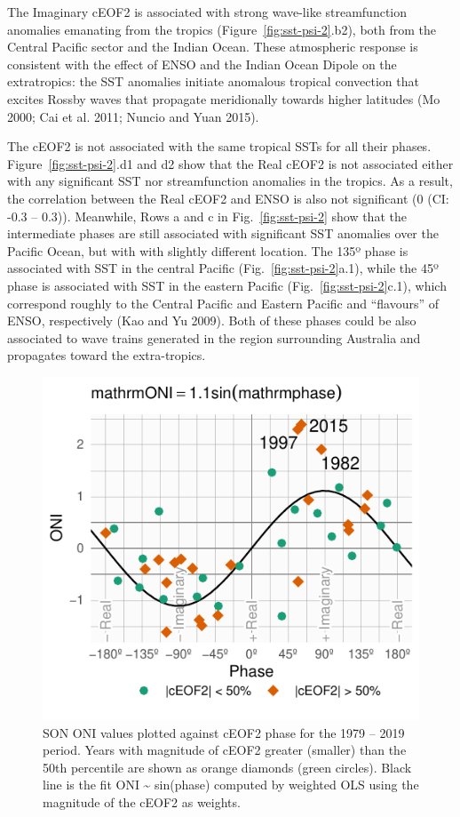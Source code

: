 \documentclass[smallextended]{svjour3}       %
\begin{document}
The Imaginary cEOF2 is associated with strong wave-like streamfunction anomalies emanating from the tropics (Figure~\ref{fig:sst-psi-2}.b2), both from the Central Pacific sector and the Indian Ocean.
These atmospheric response is consistent with the effect of ENSO and the Indian Ocean Dipole on the extratropics: the SST anomalies initiate anomalous tropical convection that excites Rossby waves that propagate meridionally towards higher latitudes (Mo 2000; Cai et al. 2011; Nuncio and Yuan 2015).

The cEOF2 is not associated with the same tropical SSTs for all their phases.
Figure~\ref{fig:sst-psi-2}.d1 and d2 show that the Real cEOF2 is not associated either with any significant SST nor streamfunction anomalies in the tropics.
As a result, the correlation between the Real cEOF2 and ENSO is also not significant (0 (CI: -0.3 -- 0.3)).
Meanwhile, Rows a and c in Fig.~\ref{fig:sst-psi-2} show that the intermediate phases are still associated with significant SST anomalies over the Pacific Ocean, but with with slightly different location.
The 135º phase is associated with SST in the central Pacific (Fig.~\ref{fig:sst-psi-2}a.1), while the 45º phase is associated with SST in the eastern Pacific (Fig.~\ref{fig:sst-psi-2}c.1), which correspond roughly to the Central Pacific and Eastern Pacific and ``flavours'' of ENSO, respectively (Kao and Yu 2009).
Both of these phases could be also associated to wave trains generated in the region surrounding Australia and propagates toward the extra-tropics.



\begin{figure}
\centering
\includegraphics{../figures/enso-phase-1.pdf}
\caption{\label{fig:enso-phase}SON ONI values plotted against cEOF2 phase for the 1979 -- 2019 period. Years with magnitude of cEOF2 greater (smaller) than the 50th percentile are shown as orange diamonds (green circles). Black line is the fit ONI \textasciitilde{} sin(phase) computed by weighted OLS using the magnitude of the cEOF2 as weights.}
\end{figure}
\end{document}
